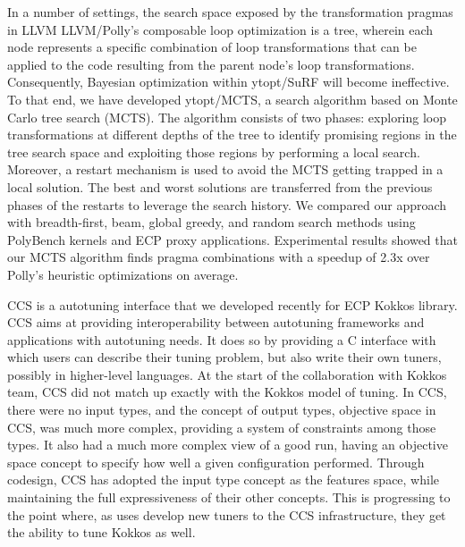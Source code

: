 In a number of settings, the search space exposed by the transformation pragmas in LLVM LLVM/Polly’s composable loop optimization is a tree, wherein each node represents a specific combination of loop transformations that can be applied to the code resulting from the parent node's loop transformations. Consequently, Bayesian optimization within ytopt/SuRF will become ineffective. To that end, we have developed ytopt/MCTS, a search algorithm based on Monte Carlo tree search (MCTS). The algorithm consists of two phases: exploring loop transformations at different depths of the tree to identify promising regions in the tree search space and exploiting those regions by performing a local search. Moreover, a restart mechanism is used to avoid the MCTS getting trapped in a local solution. The best and worst solutions are transferred from the previous phases of the restarts to leverage the search history. We compared our approach with breadth-first, beam, global greedy, and random search methods using PolyBench kernels and ECP proxy applications. Experimental results showed that our MCTS algorithm finds pragma combinations with a speedup of 2.3x over Polly's heuristic optimizations on average.

CCS is a autotuning interface that we developed recently for ECP Kokkos library. CCS aims at providing interoperability between autotuning frameworks and applications with autotuning needs. It does so by providing a C interface with which users can describe their tuning problem, but also write their own tuners, possibly in higher-level languages. At the start of the collaboration with Kokkos team, CCS did not match up exactly with the Kokkos model of tuning. In CCS, there were no input types, and the concept of output types, objective space in CCS, was much more complex, providing a system of constraints among those types. It also had a much more complex view of a good run, having an objective space concept to specify how well a given configuration performed. Through codesign, CCS has adopted the input type concept as the features space, while maintaining the full expressiveness of their other concepts. This is progressing to the point where, as uses develop new tuners to the CCS infrastructure, they get the ability to tune Kokkos as well.



